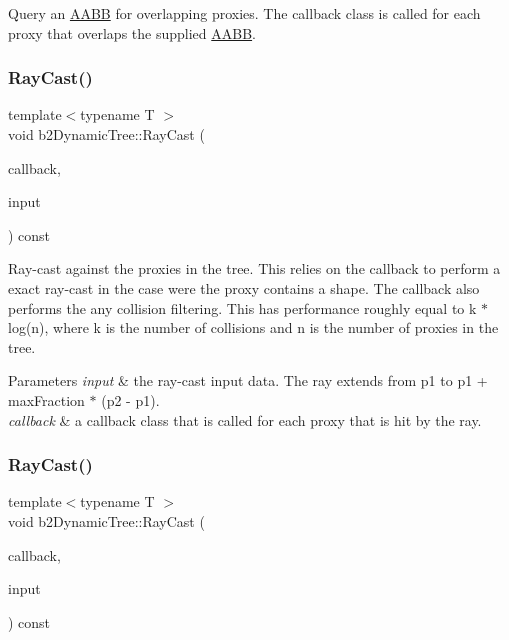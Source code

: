 Query an \hyperlink{classAABB}{A\+A\+BB} for overlapping proxies. The callback class is called for each proxy that overlaps the supplied \hyperlink{classAABB}{A\+A\+BB}. \mbox{\label{classb2DynamicTree_aebd2dc6ee462e0cd0763a5f472243a13}} 
\subsubsection{\texorpdfstring{Ray\+Cast()}{RayCast()}\hspace{0.1cm}{\footnotesize\ttfamily [1/2]}}
{\footnotesize\ttfamily template$<$typename T $>$ \\
void b2\+Dynamic\+Tree\+::\+Ray\+Cast (\begin{DoxyParamCaption}\item[{T $\ast$}]{callback,  }\item[{const \hyperlink{structb2RayCastInput}{b2\+Ray\+Cast\+Input} \&}]{input }\end{DoxyParamCaption}) const}

Ray-\/cast against the proxies in the tree. This relies on the callback to perform a exact ray-\/cast in the case were the proxy contains a shape. The callback also performs the any collision filtering. This has performance roughly equal to k $\ast$ log(n), where k is the number of collisions and n is the number of proxies in the tree. 
\begin{DoxyParams}{Parameters}
{\em input} & the ray-\/cast input data. The ray extends from p1 to p1 + max\+Fraction $\ast$ (p2 -\/ p1). \\
\hline
{\em callback} & a callback class that is called for each proxy that is hit by the ray. \\
\hline
\end{DoxyParams}
\mbox{\label{classb2DynamicTree_aebd2dc6ee462e0cd0763a5f472243a13}} 
\subsubsection{\texorpdfstring{Ray\+Cast()}{RayCast()}\hspace{0.1cm}{\footnotesize\ttfamily [2/2]}}
{\footnotesize\ttfamily template$<$typename T $>$ \\
void b2\+Dynamic\+Tree\+::\+Ray\+Cast (\begin{DoxyParamCaption}\item[{T $\ast$}]{callback,  }\item[{const \hyperlink{structb2RayCastInput}{b2\+Ray\+Cast\+Input} \&}]{input }\end{DoxyParamCaption}) const\hspace{0.3cm}{\ttfamily [inline]}}

